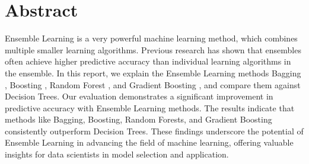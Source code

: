 \section*{Abstract}

Ensemble Learning is a very powerful machine learning method, which combines
multiple smaller learning algorithms. Previous research has shown that 
ensembles often achieve higher predictive accuracy than individual learning
algorithms in the ensemble.
In this report, we explain the Ensemble Learning methods Bagging \citep*{Breiman1996},
Boosting \citep*{Schapire1990}, Random Forest \citep*{breiman2001random},
and Gradient Boosting \citep*{breiman1997arcing, friedman2001greedy, friedman2002stochastic},
and compare them against Decision Trees.
Our evaluation demonstrates a significant improvement in predictive accuracy
with Ensemble Learning methods. The results indicate that methods like Bagging,
Boosting, Random Forests, and Gradient Boosting consistently outperform Decision Trees.
These findings underscore the potential of Ensemble Learning in advancing the field of 
machine learning, offering valuable insights for data scientists in model selection and 
application.

